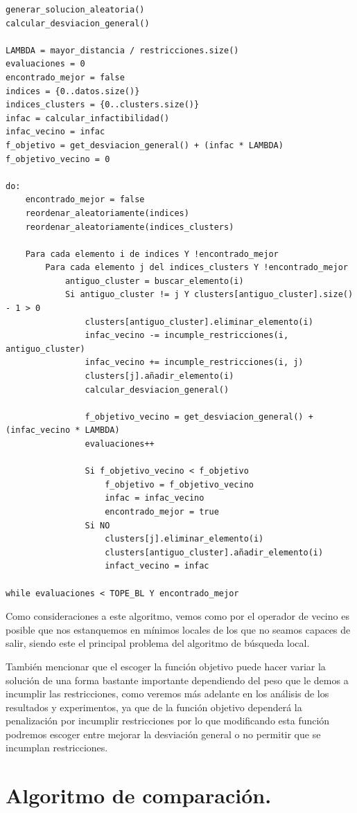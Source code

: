 \documentclass[12pt, spanish]{article}
\begin{document}
{\small
\begin{lstlisting}
generar_solucion_aleatoria()
calcular_desviacion_general()

LAMBDA = mayor_distancia / restricciones.size()
evaluaciones = 0
encontrado_mejor = false
indices = {0..datos.size()}
indices_clusters = {0..clusters.size()}
infac = calcular_infactibilidad()
infac_vecino = infac
f_objetivo = get_desviacion_general() + (infac * LAMBDA)
f_objetivo_vecino = 0

do:
	encontrado_mejor = false
	reordenar_aleatoriamente(indices)
	reordenar_aleatoriamente(indices_clusters)
	
	Para cada elemento i de indices Y !encontrado_mejor
		Para cada elemento j del indices_clusters Y !encontrado_mejor
			antiguo_cluster = buscar_elemento(i)
			Si antiguo_cluster != j Y clusters[antiguo_cluster].size() - 1 > 0
				clusters[antiguo_cluster].eliminar_elemento(i)
				infac_vecino -= incumple_restricciones(i, antiguo_cluster)
				infac_vecino += incumple_restricciones(i, j)
				clusters[j].añadir_elemento(i)
				calcular_desviacion_general()
				
				f_objetivo_vecino = get_desviacion_general() + (infac_vecino * LAMBDA)
				evaluaciones++				
				
				Si f_objetivo_vecino < f_objetivo
					f_objetivo = f_objetivo_vecino
					infac = infac_vecino
					encontrado_mejor = true
				Si NO
					clusters[j].eliminar_elemento(i)
					clusters[antiguo_cluster].añadir_elemento(i)
					infact_vecino = infac

while evaluaciones < TOPE_BL Y encontrado_mejor
 \end{lstlisting}
 }
 
 
Como consideraciones a este algoritmo, vemos como por el operador de vecino es posible que nos estanquemos en mínimos locales de los que no seamos capaces de salir, siendo este el principal problema del algoritmo de búsqueda local.

También mencionar que el escoger la función objetivo puede hacer variar la solución de una forma bastante importante dependiendo del peso que le demos a incumplir las restricciones, como veremos más adelante en los análisis de los resultados y experimentos, ya que de la función objetivo dependerá la penalización por incumplir restricciones por lo que modificando esta función podremos escoger entre mejorar la desviación general o no permitir que se incumplan restricciones.

\section{Algoritmo de comparación.}
\end{document}
